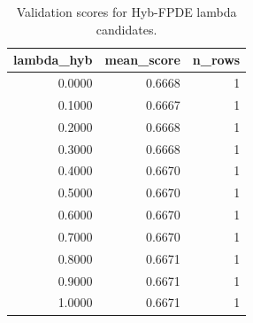 \begin{table}[t]
\caption{Validation scores for Hyb-FPDE lambda candidates.}
\label{tab:lambda_distribution_computed}
\centering
\begin{tabular}{rrr}
\toprule
lambda\_hyb & mean\_score & n\_rows \\
\midrule
0.0000 & 0.6668 & 1 \\
0.1000 & 0.6667 & 1 \\
0.2000 & 0.6668 & 1 \\
0.3000 & 0.6668 & 1 \\
0.4000 & 0.6670 & 1 \\
0.5000 & 0.6670 & 1 \\
0.6000 & 0.6670 & 1 \\
0.7000 & 0.6670 & 1 \\
0.8000 & 0.6671 & 1 \\
0.9000 & 0.6671 & 1 \\
1.0000 & 0.6671 & 1 \\
\bottomrule
\end{tabular}

\end{table}

